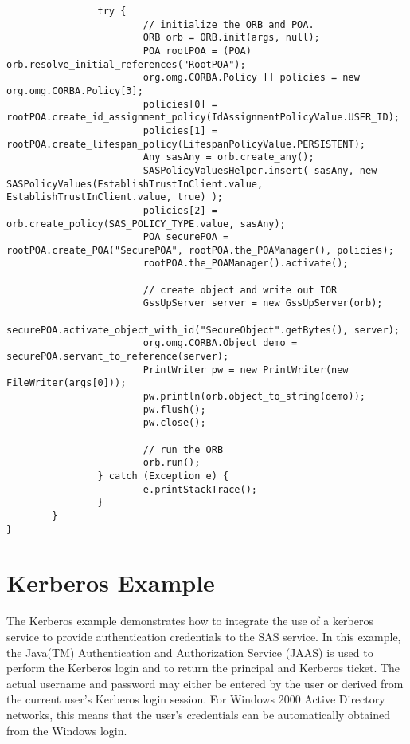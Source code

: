 \begin{scriptsize}
\begin{verbatim}
                try {
                        // initialize the ORB and POA.
                        ORB orb = ORB.init(args, null);
                        POA rootPOA = (POA) orb.resolve_initial_references("RootPOA");
                        org.omg.CORBA.Policy [] policies = new org.omg.CORBA.Policy[3];
                        policies[0] = rootPOA.create_id_assignment_policy(IdAssignmentPolicyValue.USER_ID);
                        policies[1] = rootPOA.create_lifespan_policy(LifespanPolicyValue.PERSISTENT);
                        Any sasAny = orb.create_any();
                        SASPolicyValuesHelper.insert( sasAny, new SASPolicyValues(EstablishTrustInClient.value, EstablishTrustInClient.value, true) );
                        policies[2] = orb.create_policy(SAS_POLICY_TYPE.value, sasAny);
                        POA securePOA = rootPOA.create_POA("SecurePOA", rootPOA.the_POAManager(), policies);
                        rootPOA.the_POAManager().activate();
                        
                        // create object and write out IOR
                        GssUpServer server = new GssUpServer(orb);
                        securePOA.activate_object_with_id("SecureObject".getBytes(), server);
                        org.omg.CORBA.Object demo = securePOA.servant_to_reference(server);
                        PrintWriter pw = new PrintWriter(new FileWriter(args[0]));
                        pw.println(orb.object_to_string(demo));
                        pw.flush();
                        pw.close();
                        
                        // run the ORB
                        orb.run();
                } catch (Exception e) {
                        e.printStackTrace();
                }
        }
}
\end{verbatim}
\end{scriptsize}

\section{Kerberos Example}

The Kerberos example demonstrates how to integrate the use of a kerberos
service to provide authentication credentials to the SAS service. 
In this example, the Java(TM) Authentication and Authorization Service (JAAS)
is used to perform the Kerberos login
and to return the principal and Kerberos ticket.
The actual username and password may either be entered by the user
or derived from the current user's Kerberos login session.
For Windows 2000 Active Directory networks, this means that the user's
credentials can be automatically obtained from the Windows login.

